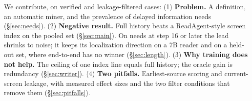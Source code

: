 We contribute, on verified and leakage-filtered cases: (1) \textbf{Problem.} A definition, an automatic miner, and the prevalence of delayed information needs (\S\ref{sec:needs}). (2) \textbf{Negative result.} Full history beats a ReadAgent-style screen index on the pooled set (\S\ref{sec:main}). On needs at step 16 or later the lead shrinks to noise; it keeps its localization direction on a 7B reader and on a held-out set, where end-to-end has no winner (\S\ref{sec:length}). (3) \textbf{Why training does not help.} The ceiling of one index line equals full history; the oracle gain is redundancy (\S\ref{sec:writer}). (4) \textbf{Two pitfalls.} Earliest-source scoring and current-screen leakage, with measured effect sizes and the two filter conditions that remove them (\S\ref{sec:pitfalls}).
